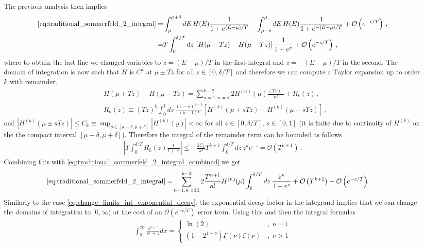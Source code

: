 \documentclass[sn-mathphys,Numbered]{sn-jnl}
\begin{document}
The previous analysis then implies 
\begin{align}
   \eqref{eq:traditional_sommerfeld_2_integral}     =&\int_\mu^{\mu+\delta} dE\, H(E)  \frac{1}{1+e^{(E-\mu)/T}}-\int_{\mu-\delta}^\mu dE\,H(E) \frac{1}{1+e^{-(E-\mu)/T}}+\mathcal{O}\left(e^{-c/T}\right)\,,\notag\\
   =&T\int_0^{\delta/T} dz\, \left[H(\mu+Tz)  -H(\mu-Tz)\right] \frac{1}{1+e^{z}}+\mathcal{O}\left(e^{-c/T}\right)\,,\label{eq:traditional_sommerfeld_2_integral_combined}    
\end{align}
where to obtain the last line we changed variables to $z=(E-\mu)/T$ in the first integral and $z=-(E-\mu)/T$ in the second.  The domain of integration is now such that  $H$ is $C^k$ at $\mu\pm Tz$ for all $z\in[0,\delta/T]$ and therefore we can compute a Taylor expansion up to order $k$ with remainder,
\begin{align}
 &H(\mu+Tz)- H(\mu-Tz)=\sum_{n=1,n\text{ odd}}^{k-2} 2H^{(n)}(\mu)\frac{(Tz)^n}{n!}+R_k(z)\,,\\
 &R_k(z)\equiv (Tz)^k \int_0^1 ds\,\frac{(1-s)^{k-1}}{(k-1)!} \left[H^{(k)}(\mu+sTz)+H^{(k)}(\mu-sTz)\right]\,,
\end{align}
and  $|H^{(k)}(\mu\pm sTz)|\leq C_k\equiv \sup_{y\in[\mu-\delta,\mu+\delta]}|H^{(k)}(y)|<\infty$ for all $z\in[0,\delta/T]$, $s\in[0,1]$ (it is finite due to continuity of $H^{(k)}$ on the the compact interval $[\mu-\delta,\mu+\delta]$). Therefore the integral of the remainder term can be bounded as follows
\begin{align}
    \left|T\int_0^{\delta/T} R_k(z)\frac{1}{1+e^z}\right|
    \leq&\frac{2C_k}{k!} T^{k+1}\int_0^{\delta/T}dz\, z^k e^{-z}=\mathcal{O}\left(T^{k+1}\right)\,.
\end{align}
Combining this with \eqref{eq:traditional_sommerfeld_2_integral_combined}    we get
\begin{align}
   \eqref{eq:traditional_sommerfeld_2_integral}     
   =&\sum_{n=1,n\text{ odd}}^{k-2} 2\frac{T^{n+1}}{n!} H^{(n)}(\mu)\int_0^{\delta/T} dz\,\frac{z^n}{1+e^{z}}+\mathcal{O}\left(T^{k+1}\right)+\mathcal{O}\left(e^{-c/T}\right)\,.
\end{align}
Similarly to the case \eqref{eq:change_limits_int_exponential_decay}, the exponential decay factor in the integrand implies that we can change the domains of integration to $[0,\infty)$ at the cost of an $\mathcal{O}(e^{-c/T})$ error term. Using this and then the integral formulas
\begin{align}\label{eq:FD_power_integrals}
    \int_0^\infty \frac{x^{\nu-1}}{e^{ x}+1}dx=\begin{cases}
    \ln(2) &\,, \,\,\nu=1\\
        (1-2^{1-\nu})\Gamma(\nu)\zeta(\nu)  &\,, \,\,\nu > 1
    \end{cases}
\end{align}
\end{document}
